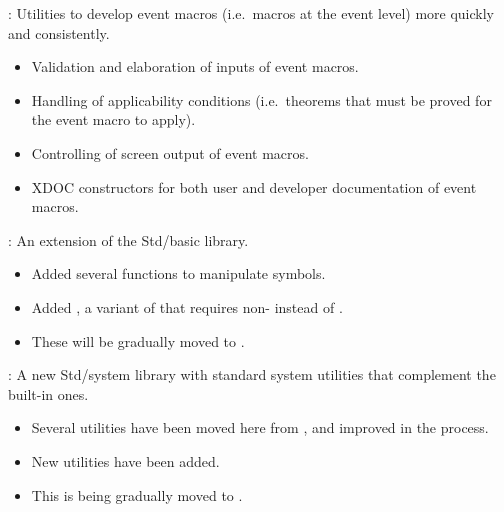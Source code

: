 \begin{frame}

\newlibtitle

:
Utilities to develop event macros (i.e.\ macros at the event level)
more quickly and consistently.
\begin{itemize}
\item
Validation and elaboration of inputs of event macros.
\item
Handling of applicability conditions
(i.e.\ theorems that must be proved for the event macro to apply).
\item
Controlling of screen output of event macros.
\item
XDOC constructors for both user and developer documentation of event macros.
\end{itemize}

\end{frame}


\begin{frame}

\newlibtitle

:
An extension of the Std/basic library.
\begin{itemize}
\item
Added several functions to manipulate symbols.
\item
Added , a variant of 
that requires non- instead of .
\item
These will be gradually moved to .
\end{itemize}

\separation

:
A new Std/system library
with standard system utilities
that complement the built-in ones.
\begin{itemize}
\item
Several utilities have been moved here from ,
and improved in the process.
\item
New utilities have been added.
\item
This is being gradually moved to .
\end{itemize}

\end{frame}


